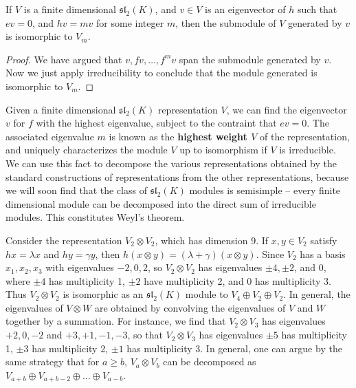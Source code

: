 \begin{corollary}
    If $V$ is a finite dimensional $\mathfrak{sl}_2(K)$, and $v \in V$ is an eigenvector of $h$ such that $ev = 0$, and $hv = mv$ for some integer $m$, then the submodule of $V$ generated by $v$ is isomorphic to $V_m$.
\end{corollary}
\begin{proof}
    We have argued that $v, fv, \dots, f^m v$ span the submodule generated by $v$. Now we just apply irreducibility to conclude that the module generated is isomorphic to $V_m$.
\end{proof}

Given a finite dimensional $\mathfrak{sl}_2(K)$ representation $V$, we can find the eigenvector $v$ for $f$ with the highest eigenvalue, subject to the contraint that $ev = 0$. The associated eigenvalue $m$ is known as the {\bf highest weight $V$} of the representation, and uniquely characterizes the module $V$ up to isomorphism if $V$ is irreducible. We can use this fact to decompose the various representations obtained by the standard constructions of representations from the other representations, because we will soon find that the class of $\mathfrak{sl}_2(K)$ modules is semisimple -- every finite dimensional module can be decomposed into the direct sum of irreducible modules. This constitutes Weyl's theorem.

\begin{example}
    Consider the representation $V_2 \otimes V_2$, which has dimension 9. If $x, y \in V_2$ satisfy $hx = \lambda x$ and $hy = \gamma y$, then $h(x \otimes y) = (\lambda + \gamma) (x \otimes y)$. Since $V_2$ has a basis $x_1, x_2, x_3$ with eigenvalues $-2, 0, 2$, so $V_2 \otimes V_2$ has eigenvalues $\pm4, \pm2$, and $0$, where $\pm 4$ has multiplicity 1, $\pm 2$ have multiplicity 2, and 0 has multiplicity 3. Thus $V_2 \otimes V_2$ is isomorphic as an $\mathfrak{sl}_2(K)$ module to $V_4 \oplus V_2 \oplus V_2$. In general, the eigenvalues of $V \otimes W$ are obtained by convolving the eigenvalues of $V$ and $W$ together by a summation. For instance, we find that $V_2 \otimes V_3$ has eigenvalues $+2,0,-2$ and $+3,+1,-1,-3$, so that $V_2 \otimes V_3$ has eigenvalues $\pm 5$ has multiplicity 1, $\pm 3$ has multiplicity 2, $\pm 1$ has multiplicity 3. In general, one can argue by the same strategy that for $a \geq b$, $V_a \otimes V_b$ can be decomposed as $V_{a+b} \oplus V_{a+b-2} \oplus \dots \oplus V_{a-b}$.
\end{example}

